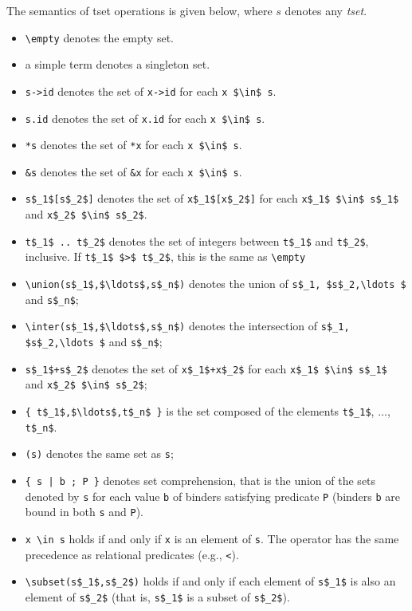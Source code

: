 The semantics of tset operations is given below,
where $s$ denotes any \textsl{tset}.
\begin{itemize}
\item \lstinline|\empty| denotes the empty set.
\item a simple term denotes a singleton set.
\item \lstinline|s->id| denotes the set of \lstinline|x->id| for each
  \lstinline|x $\in$ s|.
\item \lstinline|s.id| denotes the set of \lstinline|x.id| for each
  \lstinline|x $\in$ s|.
\item \lstinline|*s| denotes the set of \lstinline|*x| for each
  \lstinline|x $\in$ s|.
\item \lstinline|&s| denotes the set of \lstinline|&x| for each
  \lstinline|x $\in$ s|.
\item \lstinline|s$_1$[s$_2$]| denotes the set of
\lstinline|x$_1$[x$_2$]| for each \lstinline|x$_1$ $\in$ s$_1$|
  and \lstinline|x$_2$ $\in$ s$_2$|.
\item \lstinline|t$_1$ .. t$_2$| denotes the set of integers between
\lstinline|t$_1$| and \lstinline|t$_2$|, inclusive.
If \lstinline|t$_1$ $>$ t$_2$|, this is the same as \lstinline+\empty+
\item \lstinline|\union(s$_1$,$\ldots$,s$_n$)|
denotes the union
of \lstinline|s$_1, $s$_2,\ldots $| and \lstinline|s$_n$|;
\item \lstinline|\inter(s$_1$,$\ldots$,s$_n$)|
denotes the intersection
of \lstinline|s$_1, $s$_2,\ldots $| and \lstinline|s$_n$|;
\item \lstinline|s$_1$+s$_2$| denotes the set of
  \lstinline|x$_1$+x$_2$| for each \lstinline|x$_1$ $\in$ s$_1$|
  and \lstinline|x$_2$ $\in$ s$_2$|;
\item \lstinline|{ t$_1$,$\ldots$,t$_n$ }| is the set composed of the
elements \lstinline|t$_1$|, $\ldots$, \lstinline|t$_n$|.
\item \lstinline|(s)| denotes the same set as \lstinline|s|;
\item \lstinline+{ s | b ; P }+ denotes set
  comprehension,
  that is the union of the sets denoted by \lstinline|s| for each
  value \lstinline|b| of binders
  satisfying predicate \lstinline|P|
  (binders \lstinline|b| are bound in both \lstinline|s| and \lstinline|P|).
\item \lstinline|x \in s| holds if and only if \lstinline|x| is an element of \lstinline|s|.
  The operator has the same precedence as relational predicates (e.g., \lstinline|<|).
\item \lstinline|\subset(s$_1$,s$_2$)| holds if and only if each element
  of \lstinline|s$_1$| is also an element of \lstinline|s$_2$|
  (that is, \lstinline|s$_1$| is a subset of \lstinline|s$_2$|).
\end{itemize}

